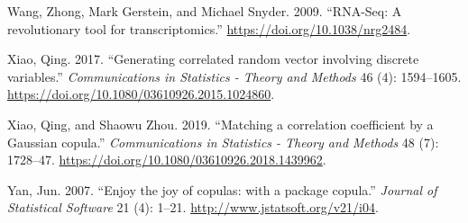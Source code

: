 \documentclass{article}
\newlength{\cslhangindent}
\newenvironment{CSLReferences}[2] %
 {%
  \setlength{\parindent}{0pt}
  \ifodd #1 \everypar{\setlength{\hangindent}{\cslhangindent}}\ignorespaces\fi
  \ifnum #2 > 0
  \setlength{\parskip}{#2\baselineskip}
  \fi
 }%
 {}
\begin{document}
\begin{CSLReferences}{1}{0}
\leavevmode{}%
Wang, Zhong, Mark Gerstein, and Michael Snyder. 2009. {``{RNA-Seq: A
revolutionary tool for transcriptomics}.''}
\url{https://doi.org/10.1038/nrg2484}.

\leavevmode{}%
Xiao, Qing. 2017. {``{Generating correlated random vector involving
discrete variables}.''} \emph{Communications in Statistics - Theory and
Methods} 46 (4): 1594--1605.
\url{https://doi.org/10.1080/03610926.2015.1024860}.

\leavevmode{}%
Xiao, Qing, and Shaowu Zhou. 2019. {``{Matching a correlation
coefficient by a Gaussian copula}.''} \emph{Communications in Statistics
- Theory and Methods} 48 (7): 1728--47.
\url{https://doi.org/10.1080/03610926.2018.1439962}.

\leavevmode{}%
Yan, Jun. 2007. {``{Enjoy the joy of copulas: with a package copula}.''}
\emph{Journal of Statistical Software} 21 (4): 1--21.
\url{http://www.jstatsoft.org/v21/i04}.

\end{CSLReferences}



\end{document}

